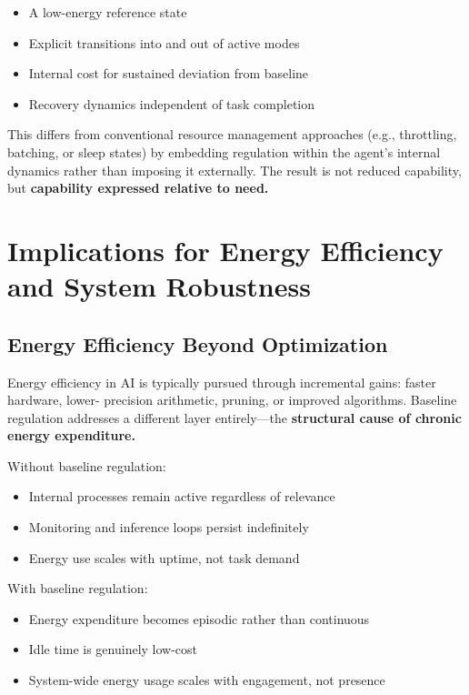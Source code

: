 \documentclass[11pt]{article}
\begin{document}
\begin{itemize}
\item A low-energy reference state
\item Explicit transitions into and out of active modes
\item Internal cost for sustained deviation from baseline
\item Recovery dynamics independent of task completion
\end{itemize}

This differs from conventional resource management approaches (e.g., throttling, batching, or sleep states) by embedding regulation within the agent’s internal dynamics rather than imposing it externally. The result is not reduced capability, but \textbf{capability expressed relative to need.}

\section{Implications for Energy Efficiency and System Robustness}


\subsection{Energy Efficiency Beyond Optimization}
Energy efficiency in AI is typically pursued through incremental gains: faster hardware, lower- precision arithmetic, pruning, or improved algorithms. Baseline regulation addresses a different layer entirely—the \textbf{structural cause of chronic energy expenditure.} 

Without baseline regulation:

\begin{itemize}
\item Internal processes remain active regardless of relevance
\item Monitoring and inference loops persist indefinitely
\item Energy use scales with uptime, not task demand
\end{itemize}

With baseline regulation:

\begin{itemize}
\item Energy expenditure becomes episodic rather than continuous
\item Idle time is genuinely low-cost
\item System-wide energy usage scales with engagement, not presence
\end{itemize}
\end{document}
